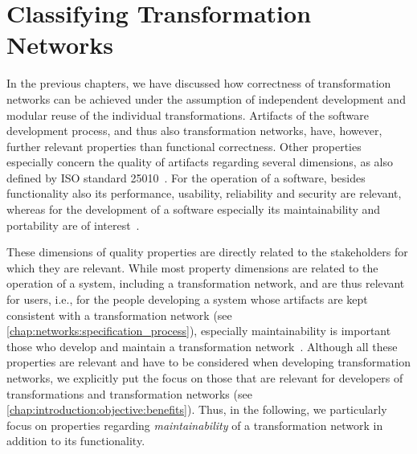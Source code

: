 \chapter{Classifying Transformation Networks
}
\label{chap:classification}

In the previous chapters, we have discussed how correctness of transformation networks can be achieved under the assumption of independent development and modular reuse of the individual transformations.
Artifacts of the software development process, and thus also transformation networks, have, however, further relevant properties than functional correctness.
Other properties especially concern the quality of artifacts regarding several dimensions, as also defined by ISO standard 25010~\cite{iso25010}.
For the operation of a software, besides functionality also its performance, usability, reliability and security are relevant, whereas for the development of a software especially its maintainability and portability are of interest~\cite[Tab. 2]{iso25010}.

These dimensions of quality properties are directly related to the stakeholders for which they are relevant.
While most property dimensions are related to the operation of a system, including a transformation network, and are thus relevant for users, i.e., for the people developing a system whose artifacts are kept consistent with a transformation network (see \autoref{chap:networks:specification_process}), especially maintainability is important those who develop and maintain a transformation network~\cite[Tab. 2]{iso25010}.
Although all these properties are relevant and have to be considered when developing transformation networks, we explicitly put the focus on those that are relevant for developers of transformations and transformation networks (see \autoref{chap:introduction:objective:benefits}).
Thus, in the following, we particularly focus on properties regarding \emph{maintainability} of a transformation network in addition to its functionality.

